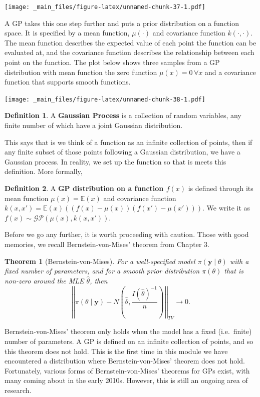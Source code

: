 \documentclass[
]{book}
\newtheorem{theorem}{Theorem}[chapter]
\theoremstyle{definition}
\newtheorem{definition}{Definition}[chapter]
\theoremstyle{definition}
\theoremstyle{definition}
\theoremstyle{definition}
\theoremstyle{remark}
\begin{document}
\texttt{[image: \_main\_files/figure-latex/unnamed-chunk-37-1.pdf]}

A GP takes this one step further and puts a prior distribution on a function space. It is specified by a mean function, \(\mu(\cdot)\) and covariance function \(k(\cdot, \cdot)\). The mean function describes the expected value of each point the function can be evaluated at, and the covariance function describes the relationship between each point on the function. The plot below shows three samples from a GP distribution with mean function the zero function \(\mu(x) = 0\, \forall x\) and a covariance function that supports smooth functions.

\texttt{[image: \_main\_files/figure-latex/unnamed-chunk-38-1.pdf]}

\begin{definition}
A \textbf{Gaussian Process} is a collection of random variables, any finite number of which have a joint Gaussian distribution.
\end{definition}

This says that is we think of a function as an infinite collection of points, then if any finite subset of those points following a Gaussian distribution, we have a Gaussian process. In reality, we set up the function so that is meets this definition. More formally,

\begin{definition}
A \textbf{GP distribution on a function \(f(x)\)} is defined through its mean function \(\mu(x) = \mathbb{E}(x)\) and covariance function \(k(x, x') = \mathbb{E}(x)\left((f(x) - \mu(x))(f(x') - \mu(x'))\right)\). We write it as \(f(x) \sim \mathcal{GP}(\mu(x), k(x, x'))\).
\end{definition}

Before we go any further, it is worth proceeding with caution. Those with good memories, we recall Bernstein-von-Mises' theorem from Chapter 3.

\begin{theorem}[Bernstein-von-Mises]
For a well-specified model \(\pi(\boldsymbol{y} \mid \theta)\) with a fixed number of parameters, and for a smooth prior distribution \(\pi(\theta)\) that is non-zero around the MLE \(\hat{\theta}\), then
\[
\left|\left| \pi(\theta \mid \boldsymbol{y}) - N\left(\hat{\theta}, \frac{I(\hat{\theta})^{-1}}{n}\right) \right|\right|_{TV} \rightarrow 0.
\]
\end{theorem}

Bernstein-von-Mises' theorem only holds when the model has a fixed (i.e.~finite) number of parameters. A GP is defined on an infinite collection of points, and so this theorem does not hold. This is the first time in this module we have encountered a distribution where Bernstein-von-Mises' theorem does not hold. Fortunately, various forms of Bernstein-von-Mises' theorems for GPs exist, with many coming about in the early 2010s. However, this is still an ongoing area of research.
\end{document}
